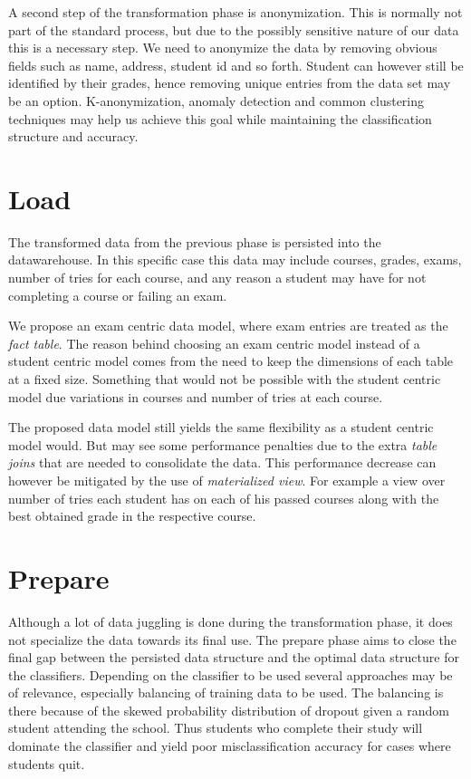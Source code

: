 \bigskip\noindent
A second step of the transformation phase is anonymization. 
This is normally not part of the standard process, but due to the possibly sensitive nature of our data this is a necessary step.
We need to anonymize the data by removing obvious fields such as name, address, student id and so forth. 
Student can however still be identified by their grades, hence removing unique entries from the data set may be an option.
K-anonymization, anomaly detection and common clustering techniques may help us achieve this goal while maintaining the classification structure and accuracy.

\section{Load}
The transformed data from the previous phase is persisted into the datawarehouse. 
In this specific case this data may include courses, grades, exams, number of tries for each course, 
and any reason a student may have for not completing a course or failing an exam.

\bigskip\noindent
We propose an exam centric data model, where exam entries are treated as the \textit{fact table}. 
The reason behind choosing an exam centric model instead of a student centric model comes from the
need to keep the dimensions of each table at a fixed size. Something that would not be possible 
with the student centric model due variations in courses and number of tries at each course.

\noindent
The proposed data model still yields the same flexibility as a student centric model would. 
But may see some performance penalties due to the extra \textit{table joins} that are needed to consolidate the data.
This performance decrease can however be mitigated by the use of \textit{materialized view}.
For example a view over number of tries each student has on each of his passed courses along with the best obtained grade in the respective course.

\section{Prepare}
Although a lot of data juggling is done during the transformation phase, it does not specialize the data towards its final use. 
The prepare phase aims to close the final gap between the persisted data structure and the optimal data structure for the classifiers.
Depending on the classifier to be used several approaches may be of relevance, especially balancing of training data to be used.
The balancing is there because of the skewed probability distribution of dropout given a random student attending the school.
Thus students who complete their study will dominate the classifier and yield poor misclassification accuracy for cases where students quit.

